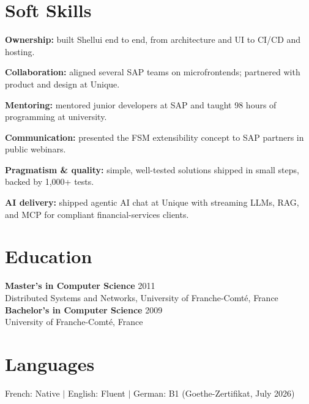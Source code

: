 \documentclass[a4paper,11pt]{article}
\begin{document}
\section{Soft Skills}
\begingroup
\setlength{\parindent}{0pt}\setlength{\parskip}{4pt}\fontsize{10.5}{13}\selectfont
\textbf{Ownership:} built Shellui end to end, from architecture and UI to CI/CD and hosting.

\textbf{Collaboration:} aligned several SAP teams on microfrontends; partnered with product and design at Unique.

\textbf{Mentoring:} mentored junior developers at SAP and taught 98 hours of programming at university.

\textbf{Communication:} presented the FSM extensibility concept to SAP partners in public webinars.

\textbf{Pragmatism \& quality:} simple, well-tested solutions shipped in small steps, backed by 1,000+ tests.

\textbf{AI delivery:} shipped agentic AI chat at Unique with streaming LLMs, RAG, and MCP for compliant financial-services clients.
\par\endgroup

\section{Education}
\begingroup\small
\textbf{Master's in Computer Science} \hfill 2011\\
Distributed Systems and Networks, University of Franche-Comté, France\\[4pt]
\textbf{Bachelor's in Computer Science} \hfill 2009\\
University of Franche-Comté, France
\par\endgroup

\section{Languages}
French: Native $|$ English: Fluent $|$ German: B1 (Goethe-Zertifikat, July 2026)
\end{document}
